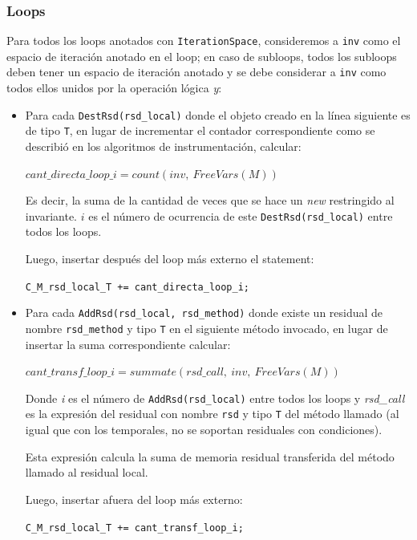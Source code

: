 \documentclass[12pt,a4paper]{article}
\newcommand\mono[1]{\texttt{#1}}
\begin{document}
			\subsubsection{Loops}
				Para todos los loops anotados con \mono{IterationSpace}, consideremos a \mono{inv} como el espacio de iteración anotado en el loop; en caso de subloops, todos los subloops deben tener un espacio de iteración anotado y se debe considerar a \mono{inv} como todos ellos unidos por la operación lógica \textit{y}:
				\begin{itemize}
					\item
						Para cada \mono{DestRsd(rsd\_local)} donde el objeto creado en la línea siguiente es de tipo \mono{T}, en lugar de incrementar el contador correspondiente como se describió en los algoritmos de instrumentación, calcular:

						\begin{center}
						$cant\_directa\_loop\_i = count(inv,\ \mathit{FreeVars}(M))$
						\end{center}

						Es decir, la suma de la cantidad de veces que se hace un \textit{new} restringido al invariante. $i$ es el número de ocurrencia de este \mono{DestRsd(rsd\_local)} entre todos los loops.

						Luego, insertar después del loop más externo el statement:

						\begin{center}
						\mono{C\_M\_rsd\_local\_T += cant\_directa\_loop\_i;}
						\end{center}
					\item
						Para cada \mono{AddRsd(rsd\_local, rsd\_method)} donde existe un residual de nombre \mono{rsd\_method} y tipo \mono{T} en el siguiente método invocado, en lugar de insertar la suma correspondiente calcular:

						\begin{center}
						$cant\_transf\_loop\_i = summate(rsd\_call,\ inv,\ \mathit{FreeVars}(M))$
						\end{center}

						Donde \textit{i} es el número de \mono{AddRsd(rsd\_local)} entre todos los loops y \textit{rsd\_call} es la expresión del residual con nombre \mono{rsd} y tipo \mono{T} del método llamado (al igual que con los temporales, no se soportan residuales con condiciones).

						Esta expresión calcula la suma de memoria residual transferida del método llamado al residual local.

						Luego, insertar afuera del loop más externo:

						\begin{center}
						\mono{C\_M\_rsd\_local\_T += cant\_transf\_loop\_i;}
						\end{center}
				\end{itemize}
\end{document}

